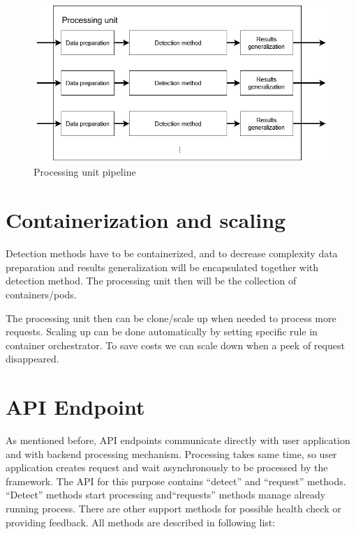 \begin{figure}[H]
    \centering
    \includegraphics[width=.65\linewidth]{other-fig/framework_architecture_processing_unit.png}
    \caption{Processing unit pipeline}
\label{fig:framework_architecture_processing_unit}
\end{figure}

\section{Containerization and scaling}

Detection methods have to be containerized, and to decrease complexity data preparation and results generalization will be encapsulated together with detection method. The processing unit then will be the collection of containers/pods.

The processing unit then can be clone/scale up when needed to process more requests. Scaling up can be done automatically by setting specific rule in container orchestrator. To save costs we can scale down when a peek of request disappeared.

\section{API Endpoint}

As mentioned before, API endpoints communicate directly with user application and with backend processing mechanism. Processing takes same time, so user application creates request and wait asynchronously to be processed by the framework. The API for this purpose contains “detect” and “request” methods. “Detect” methods start processing and“requests” methods manage already running process. There are other support methods for possible health check or providing feedback. All methods are described in following list:

